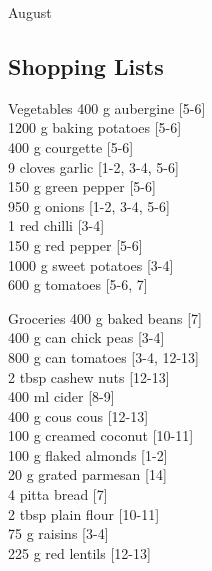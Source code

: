 \begin{menu}{August}
    \subsection*{Shopping Lists}
      \begin{shoppinglist}{Vegetables}
      400 g aubergine 
        {\scriptsize[5-6]}\\
      1200 g baking potatoes 
        {\scriptsize[5-6]}\\
      400 g courgette 
        {\scriptsize[5-6]}\\
      9 cloves garlic 
        {\scriptsize[1-2, 3-4, 5-6]}\\
      150 g green pepper 
        {\scriptsize[5-6]}\\
      950 g onions 
        {\scriptsize[1-2, 3-4, 5-6]}\\
      1  red chilli 
        {\scriptsize[3-4]}\\
      150 g red pepper 
        {\scriptsize[5-6]}\\
      1000 g sweet potatoes 
        {\scriptsize[3-4]}\\
      600 g tomatoes 
        {\scriptsize[5-6, 7]}\\
      \end{shoppinglist}%
      \begin{shoppinglist}{Groceries}
      400 g baked beans 
        {\scriptsize[7]}\\
      400 g can chick peas 
        {\scriptsize[3-4]}\\
      800 g can tomatoes 
        {\scriptsize[3-4, 12-13]}\\
      2 tbsp cashew nuts 
        {\scriptsize[12-13]}\\
      400 ml cider 
        {\scriptsize[8-9]}\\
      400 g cous cous 
        {\scriptsize[12-13]}\\
      100 g creamed coconut 
        {\scriptsize[10-11]}\\
      100 g flaked almonds 
        {\scriptsize[1-2]}\\
      20 g grated parmesan 
        {\scriptsize[14]}\\
      4  pitta bread 
        {\scriptsize[7]}\\
      2 tbsp plain flour 
        {\scriptsize[10-11]}\\
      75 g raisins 
        {\scriptsize[3-4]}\\
      225 g red lentils 
        {\scriptsize[12-13]}\\

\end{shoppinglist}
\end{menu}
